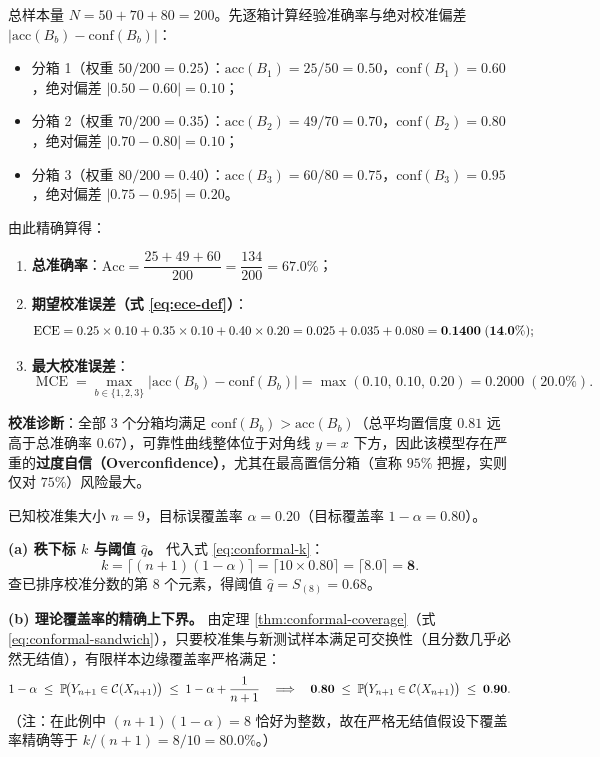 总样本量 $N = 50 + 70 + 80 = 200$。先逐箱计算经验准确率与绝对校准偏差 $|\mathrm{acc}(B_b) - \mathrm{conf}(B_b)|$：
\begin{itemize}
  \item 分箱 1（权重 $50/200 = 0.25$）：$\mathrm{acc}(B_1) = 25/50 = 0.50$，$\mathrm{conf}(B_1) = 0.60$，绝对偏差 $|0.50 - 0.60| = 0.10$；
  \item 分箱 2（权重 $70/200 = 0.35$）：$\mathrm{acc}(B_2) = 49/70 = 0.70$，$\mathrm{conf}(B_2) = 0.80$，绝对偏差 $|0.70 - 0.80| = 0.10$；
  \item 分箱 3（权重 $80/200 = 0.40$）：$\mathrm{acc}(B_3) = 60/80 = 0.75$，$\mathrm{conf}(B_3) = 0.95$，绝对偏差 $|0.75 - 0.95| = 0.20$。
\end{itemize}
由此精确算得：
\begin{enumerate}
  \item \textbf{总准确率}：$\mathrm{Acc} = \dfrac{25 + 49 + 60}{200} = \dfrac{134}{200} = \mathbf{67.0\%}$；
  \item \textbf{期望校准误差（式 \eqref{eq:ece-def}）}：
  \[
    \operatorname{ECE} = 0.25 \times 0.10 + 0.35 \times 0.10 + 0.40 \times 0.20
    = 0.025 + 0.035 + 0.080 = \mathbf{0.1400} \;(\mathbf{14.0\%});
  \]
  \item \textbf{最大校准误差}：
  \[
    \operatorname{MCE} = \max_{b \in \{1,2,3\}} |\mathrm{acc}(B_b) - \mathrm{conf}(B_b)|
    = \max(0.10,\, 0.10,\, 0.20) = \mathbf{0.2000} \;(\mathbf{20.0\%}).
  \]
\end{enumerate}
\textbf{校准诊断}：全部 $3$ 个分箱均满足 $\mathrm{conf}(B_b) > \mathrm{acc}(B_b)$（总平均置信度 $0.81$ 远高于总准确率 $0.67$），可靠性曲线整体位于对角线 $y = x$ 下方，因此该模型存在严重的\textbf{过度自信（Overconfidence）}，尤其在最高置信分箱（宣称 $95\%$ 把握，实则仅对 $75\%$）风险最大。


已知校准集大小 $n = 9$，目标误覆盖率 $\alpha = 0.20$（目标覆盖率 $1 - \alpha = 0.80$）。

\textbf{(a) 秩下标 $k$ 与阈值 $\hat{q}$。}
代入式 \eqref{eq:conformal-k}：
\[
  k = \lceil (n + 1)(1 - \alpha) \rceil = \lceil 10 \times 0.80 \rceil = \lceil 8.0 \rceil = \mathbf{8}.
\]
查已排序校准分数的第 $8$ 个元素，得阈值 $\hat{q} = S_{(8)} = \mathbf{0.68}$。

\textbf{(b) 理论覆盖率的精确上下界。}
由定理 \ref{thm:conformal-coverage}（式 \eqref{eq:conformal-sandwich}），只要校准集与新测试样本满足可交换性（且分数几乎必然无结值），有限样本边缘覆盖率严格满足：
\[
  1 - \alpha \;\le\; \mathbb{P}\!\big(Y_{n+1} \in \mathcal{C}(X_{n+1})\big) \;\le\; 1 - \alpha + \frac{1}{n + 1}
  \quad\Longrightarrow\quad
  \mathbf{0.80} \;\le\; \mathbb{P}\!\big(Y_{n+1} \in \mathcal{C}(X_{n+1})\big) \;\le\; \mathbf{0.90}.
\]
（注：在此例中 $(n+1)(1-\alpha) = 8$ 恰好为整数，故在严格无结值假设下覆盖率精确等于 $k/(n+1) = 8/10 = \mathbf{80.0\%}$。）

